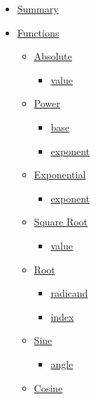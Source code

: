 \begin{itemize}
\tightlist
\item
  \hyperref[summary]{Summary}
\item
  \hyperref[functions]{Functions}

  \begin{itemize}
  \tightlist
  \item
    \hyperref[functions-abs]{Absolute}

    \begin{itemize}
    \tightlist
    \item
      \hyperref[functions-abs-value]{value}
    \end{itemize}
  \item
    \hyperref[functions-pow]{Power}

    \begin{itemize}
    \tightlist
    \item
      \hyperref[functions-pow-base]{base}
    \item
      \hyperref[functions-pow-exponent]{exponent}
    \end{itemize}
  \item
    \hyperref[functions-exp]{Exponential}

    \begin{itemize}
    \tightlist
    \item
      \hyperref[functions-exp-exponent]{exponent}
    \end{itemize}
  \item
    \hyperref[functions-sqrt]{Square Root}

    \begin{itemize}
    \tightlist
    \item
      \hyperref[functions-sqrt-value]{value}
    \end{itemize}
  \item
    \hyperref[functions-root]{Root}

    \begin{itemize}
    \tightlist
    \item
      \hyperref[functions-root-radicand]{radicand}
    \item
      \hyperref[functions-root-index]{index}
    \end{itemize}
  \item
    \hyperref[functions-sin]{Sine}

    \begin{itemize}
    \tightlist
    \item
      \hyperref[functions-sin-angle]{angle}
    \end{itemize}
  \item
    \hyperref[functions-cos]{Cosine}


\end{itemize}
\end{itemize}

